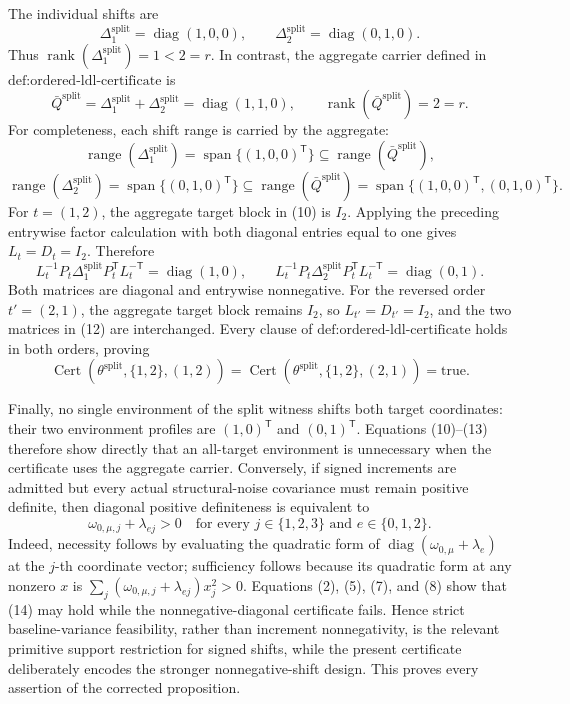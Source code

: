 The individual shifts are
\[
 \Delta^{\mathrm{split}}_1=\operatorname{diag}(1,0,0),\qquad
 \Delta^{\mathrm{split}}_2=\operatorname{diag}(0,1,0). \tag{9}
\]
Thus \(\operatorname{rank}(\Delta^{\mathrm{split}}_1)=1<2=r\).  In contrast, the aggregate carrier defined in \(\text{def:ordered-ldl-certificate}\) is
\[
 \bar Q^{\mathrm{split}}
 =\Delta^{\mathrm{split}}_1+\Delta^{\mathrm{split}}_2
 =\operatorname{diag}(1,1,0),\qquad
 \operatorname{rank}(\bar Q^{\mathrm{split}})=2=r. \tag{10}
\]
For completeness, each shift range is carried by the aggregate:
\[
 \operatorname{range}(\Delta^{\mathrm{split}}_1)
 =\operatorname{span}\{(1,0,0)^{\mathsf T}\}
 \subseteq\operatorname{range}(\bar Q^{\mathrm{split}}),
\]
\[
 \operatorname{range}(\Delta^{\mathrm{split}}_2)
 =\operatorname{span}\{(0,1,0)^{\mathsf T}\}
 \subseteq\operatorname{range}(\bar Q^{\mathrm{split}})
 =\operatorname{span}\{(1,0,0)^{\mathsf T},(0,1,0)^{\mathsf T}\}. \tag{11}
\]
For \(t=(1,2)\), the aggregate target block in (10) is \(I_2\).  Applying the preceding entrywise factor calculation with both diagonal entries equal to one gives \(L_t=D_t=I_2\).  Therefore
\[
 L_t^{-1}P_t\Delta^{\mathrm{split}}_1P_t^{\mathsf T}L_t^{-\mathsf T}
 =\operatorname{diag}(1,0),\qquad
 L_t^{-1}P_t\Delta^{\mathrm{split}}_2P_t^{\mathsf T}L_t^{-\mathsf T}
 =\operatorname{diag}(0,1). \tag{12}
\]
Both matrices are diagonal and entrywise nonnegative.  For the reversed order \(t'=(2,1)\), the aggregate target block remains \(I_2\), so \(L_{t'}=D_{t'}=I_2\), and the two matrices in (12) are interchanged.  Every clause of \(\text{def:ordered-ldl-certificate}\) holds in both orders, proving
\[
 \operatorname{Cert}(\theta^{\mathrm{split}},\{1,2\},(1,2))
 =\operatorname{Cert}(\theta^{\mathrm{split}},\{1,2\},(2,1))
 =\mathrm{true}. \tag{13}
\]

Finally, no single environment of the split witness shifts both target coordinates: their two environment profiles are \((1,0)^{\mathsf T}\) and \((0,1)^{\mathsf T}\).  Equations (10)--(13) therefore show directly that an all-target environment is unnecessary when the certificate uses the aggregate carrier.  Conversely, if signed increments are admitted but every actual structural-noise covariance must remain positive definite, then diagonal positive definiteness is equivalent to
\[
 \omega_{0,\mu,j}+\lambda_{ej}>0
 \quad\text{for every }j\in\{1,2,3\}\text{ and }e\in\{0,1,2\}. \tag{14}
\]
Indeed, necessity follows by evaluating the quadratic form of \(\operatorname{diag}(\omega_{0,\mu}+\lambda_e)\) at the \(j\)-th coordinate vector; sufficiency follows because its quadratic form at any nonzero \(x\) is \(\sum_j(\omega_{0,\mu,j}+\lambda_{ej})x_j^2>0\).  Equations (2), (5), (7), and (8) show that (14) may hold while the nonnegative-diagonal certificate fails.  Hence strict baseline-variance feasibility, rather than increment nonnegativity, is the relevant primitive support restriction for signed shifts, while the present certificate deliberately encodes the stronger nonnegative-shift design.  This proves every assertion of the corrected proposition.
